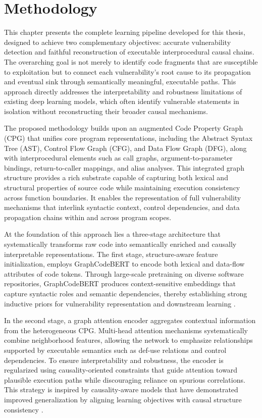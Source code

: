 \documentclass{buthesis}
\begin{document}
\chapter{Methodology}
\label{chap:method-architecture}

This chapter presents the complete learning pipeline developed for this thesis, designed to achieve two complementary objectives: accurate vulnerability detection and faithful reconstruction of executable interprocedural causal chains. The overarching goal is not merely to identify code fragments that are susceptible to exploitation but to connect each vulnerability’s root cause to its propagation and eventual sink through semantically meaningful, executable paths. This approach directly addresses the interpretability and robustness limitations of existing deep learning models, which often identify vulnerable statements in isolation without reconstructing their broader causal mechanisms.

The proposed methodology builds upon an augmented Code Property Graph (CPG) that unifies core program representations, including the Abstract Syntax Tree (AST), Control Flow Graph (CFG), and Data Flow Graph (DFG), along with interprocedural elements such as call graphs, argument-to-parameter bindings, return-to-caller mappings, and alias analyses. This integrated graph structure provides a rich substrate capable of capturing both lexical and structural properties of source code while maintaining execution consistency across function boundaries. It enables the representation of full vulnerability mechanisms that interlink syntactic context, control dependencies, and data propagation chains within and across program scopes. 

At the foundation of this approach lies a three-stage architecture that systematically transforms raw code into semantically enriched and causally interpretable representations. The first stage, structure-aware feature initialization, employs GraphCodeBERT to encode both lexical and data-flow attributes of code tokens. Through large-scale pretraining on diverse software repositories, GraphCodeBERT produces context-sensitive embeddings that capture syntactic roles and semantic dependencies, thereby establishing strong inductive priors for vulnerability representation and downstream learning \cite{guo2021graphcodebert}. 

In the second stage, a graph attention encoder aggregates contextual information from the heterogeneous CPG. Multi-head attention mechanisms systematically combine neighborhood features, allowing the network to emphasize relationships supported by executable semantics such as def-use relations and control dependencies. To ensure interpretability and robustness, the encoder is regularized using causality-oriented constraints that guide attention toward plausible execution paths while discouraging reliance on spurious correlations. This strategy is inspired by causality-aware models that have demonstrated improved generalization by aligning learning objectives with causal structure consistency \cite{Cao2024ICSE,Rahman2024ICSE,Kuang2024KSEM}. 
\end{document}
